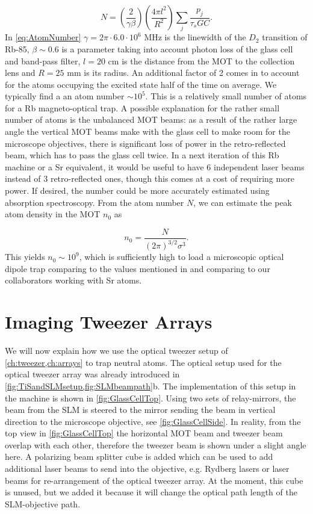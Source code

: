  \begin{equation}\label{eq:AtomNumber}
     N = \left( \frac{2}{\gamma\beta}\right)
     \left(\frac{4\pi l^2}{R^2}\right)
     \sum_j \frac{p_j}{\tau_s G C}.
 \end{equation}
In \cref{eq:AtomNumber} $\gamma = 2\pi \cdot 6.0 \cdot 10^6$ MHz is the linewidth of the $D_2$ transition of Rb-85, $\beta \sim 0.6$ is a parameter taking into account photon loss of the glass cell and band-pass filter, $l = 20$ cm is the distance from the MOT to the collection lens and $R = 25$ mm is its radius. 
An additional factor of 2 comes in to account for the atoms occupying the excited state half of the time on average. 
We typically find a an atom number $\sim 10^5$.
This is a relatively small number of atoms for a Rb magneto-optical trap.
A possible explanation for the rather small number of atoms is the unbalanced MOT beams: as a result of the rather large angle the vertical MOT beams make with the glass cell to make room for the microscope objectives, there is significant loss of power in the retro-reflected beam, which has to pass the glass cell twice. 
In a next iteration of this Rb machine or a Sr equivalent, it would be useful to have 6 independent laser beams instead of 3 retro-reflected ones, though this comes at a cost of requiring more power. 
If desired, the number could be more accurately estimated using absorption spectroscopy.
From the atom number $N$, we can estimate the peak atom density in the MOT $n_0$ as \cite{Townsend1995}

\begin{equation}
    n_0 = \frac{N}{(2\pi)^{3/2}\sigma^3}.
\end{equation}
This yields $n_0 \sim 10^9$, which is sufficiently high to load a microscopic optical dipole trap comparing to the values mentioned in \cite{Schlosser2002} and comparing to our collaborators working with Sr atoms.


\section{Imaging Tweezer Arrays}\label{sec:Tweezers}

We will now explain how we use the optical tweezer setup of \cref{ch:tweezer,ch:arrays} to trap neutral atoms. 
The optical setup used for the optical tweezer array was already introduced in \cref{fig:TiSandSLMsetup,fig:SLMbeampath}b.
The implementation of this setup in the machine is shown in \cref{fig:GlassCellTop}.
Using two sets of relay-mirrors, the beam from the \ac{SLM} is steered to the mirror sending the beam in vertical direction to the microscope objective, see \cref{fig:GlassCellSide}. 
In reality, from the top view in \cref{fig:GlassCellTop} the horizontal MOT beam and tweezer beam overlap with each other, therefore the tweezer beam is shown under a slight angle here.
A polarizing beam splitter cube is added which can be used to add additional laser beams to send into the objective, e.g. Rydberg lasers or laser beams for re-arrangement of the optical tweezer array. 
At the moment, this cube is unused, but we added it because it will change the optical path length of the SLM-objective path.

